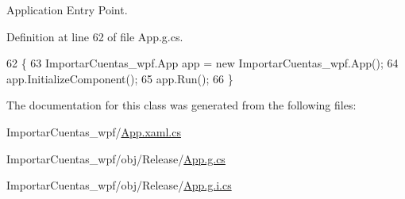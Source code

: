 Application Entry Point. 



Definition at line 62 of file App.\-g.\-cs.


\begin{DoxyCode}
62                                   \{
63             ImportarCuentas\_wpf.App app = \textcolor{keyword}{new} ImportarCuentas\_wpf.App();
64             app.InitializeComponent();
65             app.Run();
66         \}
\end{DoxyCode}


The documentation for this class was generated from the following files\-:\begin{DoxyCompactItemize}
\item 
Importar\-Cuentas\-\_\-wpf/\hyperlink{_importar_cuentas__wpf_2_app_8xaml_8cs}{App.\-xaml.\-cs}\item 
Importar\-Cuentas\-\_\-wpf/obj/\-Release/\hyperlink{_importar_cuentas__wpf_2obj_2_release_2_app_8g_8cs}{App.\-g.\-cs}\item 
Importar\-Cuentas\-\_\-wpf/obj/\-Release/\hyperlink{_importar_cuentas__wpf_2obj_2_release_2_app_8g_8i_8cs}{App.\-g.\-i.\-cs}\end{DoxyCompactItemize}

